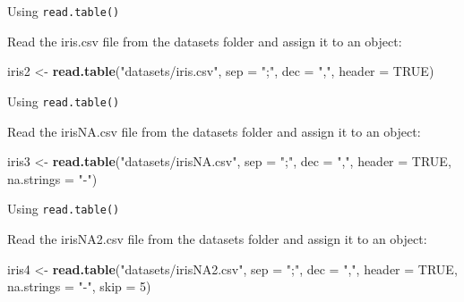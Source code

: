 \documentclass[ignorenonframetext,]{beamer}
\newenvironment{Shaded}{\begin{snugshade}}{\end{snugshade}}
\newcommand{\DataTypeTok}[1]{\textcolor[rgb]{0.13,0.29,0.53}{#1}}
\newcommand{\DecValTok}[1]{\textcolor[rgb]{0.00,0.00,0.81}{#1}}
\newcommand{\KeywordTok}[1]{\textcolor[rgb]{0.13,0.29,0.53}{\textbf{#1}}}
\newcommand{\NormalTok}[1]{#1}
\newcommand{\OtherTok}[1]{\textcolor[rgb]{0.56,0.35,0.01}{#1}}
\newcommand{\StringTok}[1]{\textcolor[rgb]{0.31,0.60,0.02}{#1}}
\begin{document}
\begin{frame}[fragile]{Using \texttt{read.table()}}
\protect\hypertarget{using-read.table-3}{}

Read the iris.csv file from the datasets folder and assign it to an
object:

\begin{Shaded}
\begin{Highlighting}[]
\NormalTok{iris2 <-}\StringTok{ }\KeywordTok{read.table}\NormalTok{(}\StringTok{"datasets/iris.csv"}\NormalTok{,}
                    \DataTypeTok{sep =} \StringTok{";"}\NormalTok{,}
                    \DataTypeTok{dec =} \StringTok{","}\NormalTok{,}
                    \DataTypeTok{header =} \OtherTok{TRUE}\NormalTok{)}
\end{Highlighting}
\end{Shaded}

\end{frame}

\begin{frame}[fragile]{Using \texttt{read.table()}}
\protect\hypertarget{using-read.table-4}{}

Read the irisNA.csv file from the datasets folder and assign it to an
object:

\begin{Shaded}
\begin{Highlighting}[]
\NormalTok{iris3 <-}\StringTok{ }\KeywordTok{read.table}\NormalTok{(}\StringTok{"datasets/irisNA.csv"}\NormalTok{,}
                    \DataTypeTok{sep =} \StringTok{";"}\NormalTok{,}
                    \DataTypeTok{dec =} \StringTok{","}\NormalTok{,}
                    \DataTypeTok{header =} \OtherTok{TRUE}\NormalTok{,}
                    \DataTypeTok{na.strings =} \StringTok{"-"}\NormalTok{)}
\end{Highlighting}
\end{Shaded}

\end{frame}

\begin{frame}[fragile]{Using \texttt{read.table()}}
\protect\hypertarget{using-read.table-5}{}

Read the irisNA2.csv file from the datasets folder and assign it to an
object:

\begin{Shaded}
\begin{Highlighting}[]
\NormalTok{iris4 <-}\StringTok{ }\KeywordTok{read.table}\NormalTok{(}\StringTok{"datasets/irisNA2.csv"}\NormalTok{, }
                    \DataTypeTok{sep =} \StringTok{";"}\NormalTok{,}
                    \DataTypeTok{dec =} \StringTok{","}\NormalTok{,}
                    \DataTypeTok{header =} \OtherTok{TRUE}\NormalTok{,}
                    \DataTypeTok{na.strings =} \StringTok{"-"}\NormalTok{,}
                    \DataTypeTok{skip =} \DecValTok{5}\NormalTok{)}
\end{Highlighting}
\end{Shaded}

\end{frame}
\end{document}
